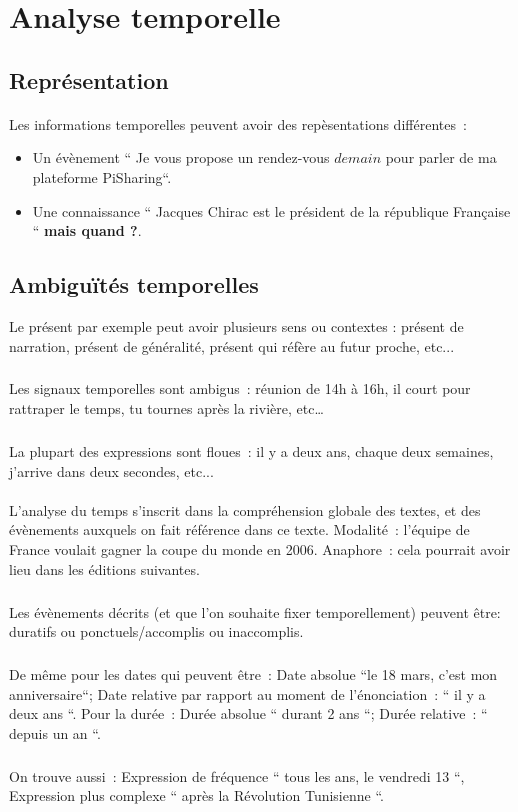 \section*{Analyse temporelle}
\subsection*{Représentation}
\paragraph{}
Les informations temporelles peuvent avoir des repèsentations différentes~: 
\begin{itemize}
\item Un évènement `` Je vous propose un rendez-vous $demain$ pour parler de ma plateforme PiSharing``. \item Une connaissance `` Jacques Chirac est le président de la république Française `` \textbf{ mais quand ?}.
\end{itemize}
\subsection*{Ambiguïtés temporelles}
Le présent par exemple peut avoir plusieurs sens ou contextes : présent de narration, présent de généralité, présent qui réfère au futur proche, etc...
\subparagraph{}
Les signaux temporelles sont ambigus~: réunion de 14h à 16h, il court pour rattraper le temps, tu tournes après la rivière, etc…
\subparagraph{}
La plupart des expressions sont floues~: il y a deux ans, chaque deux semaines, j’arrive dans deux secondes, etc...
\paragraph{}
L’analyse du temps s’inscrit dans la compréhension globale des textes, et des évènements auxquels on fait référence dans ce texte. 
\newline
Modalité~: l’équipe de France voulait gagner la coupe du monde en 2006. 
\newline
Anaphore~: cela pourrait avoir lieu dans les éditions suivantes.
\subparagraph{}
Les évènements décrits (et que l’on souhaite fixer temporellement) peuvent être: duratifs ou ponctuels/accomplis ou inaccomplis. 
\subparagraph{}
De même pour les dates qui peuvent être~: Date absolue ``le 18 mars, c'est mon anniversaire``; Date relative par rapport au moment de l’énonciation~: `` il y a deux ans ``. Pour la durée~: Durée absolue `` durant 2 ans ``; Durée relative~: `` depuis un an ``.
\subparagraph{}
On trouve aussi~: Expression de fréquence `` tous les ans, le vendredi 13 ``, Expression plus complexe `` après la Révolution Tunisienne ``.
